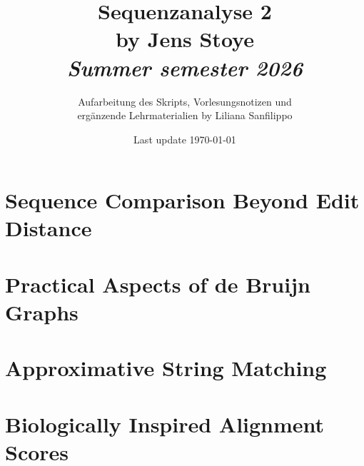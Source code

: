 








\usepackage{biblatex}

\title{Sequenzanalyse 2 \\ \small{by Jens Stoye} \\ \textit{\footnotesize{Summer semester 2026} } }
\author{Aufarbeitung des Skripts, Vorlesungsnotizen und \\ ergänzende Lehrmaterialien by Liliana Sanfilippo}
\date{Last update \today}


\newcommand{\skript}[1]{
    ``#1''
    \cite{seqan_skript}
}



\maketitle


\tableofcontents 

\chapter{Sequence Comparison Beyond Edit Distance}\label{ch:sequence-comparison-beyond-edit-distance}



\chapter{Practical Aspects of de Bruijn Graphs}\label{ch:practical-aspects-of-de-bruijn-graphs}


\chapter{Approximative String Matching}\label{ch:approximative-string-matching}


\chapter{Biologically Inspired Alignment Scores}\label{ch:biologically-inspired-alignment-scores}


